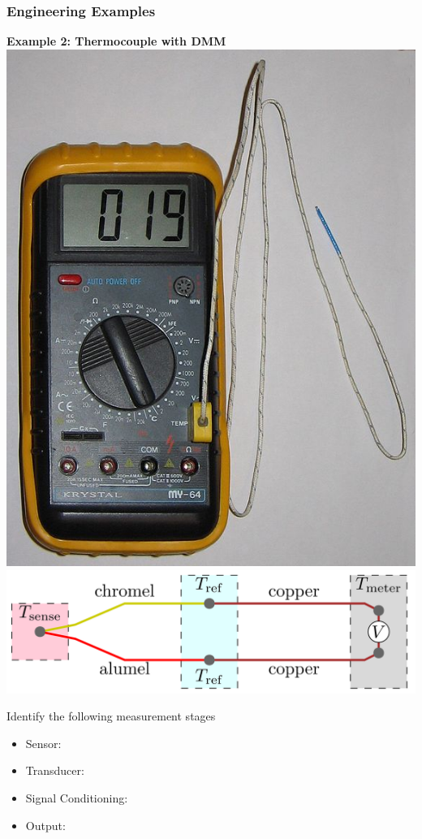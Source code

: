 \documentclass[fleqn]{beamer} %
\newcommand{\sectiontitleV}{Engineering Examples}
\begin{document}
	\begin{frame}[label=sectionV]
		\frametitle{\sectiontitleV}
			\tiny
		
	        \begin{multicols}{2}
		
		    \textbf{Example 2: Thermocouple with DMM} \vspc
		    \includegraphics[scale=0.35]{thermocouple.jpg}
		    \includegraphics[scale=0.1]{thermocouple_concept.png} \vspc

		    Identify the following measurement stages 
		    \begin{itemize}
		    	\item Sensor: \hspcu
		    	\item Transducer: \hspcu
		    	\item Signal Conditioning: \hspcu
		    	\item Output: \hspcu
		    \end{itemize}



\end{multicols}
\end{frame}
\end{document}

